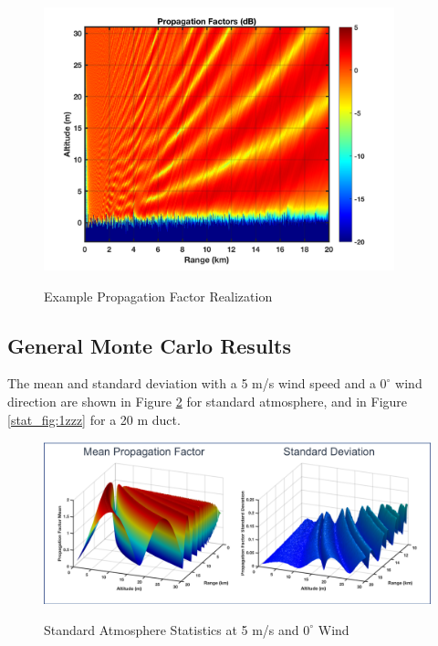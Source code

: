 \begin{figure}[H]
  \begin{center}
\includegraphics[width=4in]{../media/statistics/pf_2.png}
  \end{center}
  \renewcommand{\baselinestretch}{1} \small\normalsize
  \begin{quote}
    \caption[Example Propagation Factor Realization]{Example Propagation Factor Realization\label{stat_fig:1b}}
  \end{quote}
\end{figure}
\renewcommand{\baselinestretch}{2} \small\normalsize

\subsection{General Monte Carlo Results}
The mean and standard deviation with a 5 m/s wind speed and a $0^\circ$ wind direction are shown in Figure \ref{stat_fig:1zz} for standard atmosphere, and in Figure \ref{stat_fig:1zzz} for a 20 m duct.

\begin{figure}[H]
  \begin{center}
\includegraphics[width=5.5in]{../media/multistatic/std_atmos_results.png}
  \end{center}
  \renewcommand{\baselinestretch}{1} \small\normalsize
  \begin{quote}
    \caption[Standard Atmosphere Statistics at 5 m/s and $0^{\circ}$ Wind]{Standard Atmosphere Statistics at 5 m/s and $0^{\circ}$ Wind\label{stat_fig:1zz}}
  \end{quote}
\end{figure}
\renewcommand{\baselinestretch}{2} \small\normalsize

